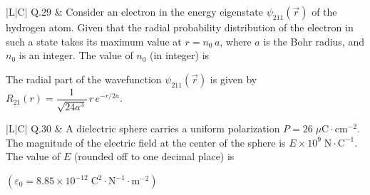 \documentclass[12pt,a4paper]{article}
\begin{document}
\vspace{0.4cm}

\begin{table}[h!]
\begin{tabular}{|L|C|}
\hline
Q.29 &
Consider an electron in the energy eigenstate $\psi_{211}(\vec{r})$ of the hydrogen atom.
Given that the radial probability distribution of the electron in such a state takes its
maximum value at $r = n_0\,a$, where $a$ is the Bohr radius, and $n_0$ is an integer.
The value of $n_0$ (in integer) is \underline{\hspace{1.5cm}}

\medskip
The radial part of the wavefunction $\psi_{211}(\vec{r})$ is given by
$R_{21}(r) = \dfrac{1}{\sqrt{24a^3}}\,r\,e^{-r/2a}$. \\
\hline
\end{tabular}
\end{table}

\vspace{0.4cm}

\begin{table}[h!]
\begin{tabular}{|L|C|}
\hline
Q.30 &
A dielectric sphere carries a uniform polarization $P = 26\;\mu\text{C}\cdot\text{cm}^{-2}$.
The magnitude of the electric field at the center of the sphere is
$E \times 10^{9}\;\text{N}\cdot\text{C}^{-1}$. The value of $E$ (rounded off to one
decimal place) is \underline{\hspace{1.5cm}}

\medskip
$(\varepsilon_0 = 8.85 \times 10^{-12}\;\text{C}^2\cdot\text{N}^{-1}\cdot\text{m}^{-2})$ \\
\hline
\end{tabular}
\end{table}

\vspace{0.4cm}
\end{document}
